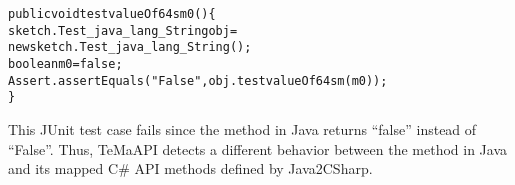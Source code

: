 \begin{CodeOut}%
\begin{alltt}
  public void testvalueOf64sm0()\{
    sketch.Test_java_lang_String obj =
          new sketch.Test_java_lang_String();
    boolean m0 = false;
    Assert.assertEquals("False", obj.testvalueOf64sm(m0));
  \}
\end{alltt}
\end{CodeOut}

This JUnit test case fails since the  method in Java returns ``false'' instead of ``False''. Thus, TeMaAPI detects a different behavior between the  method in Java and its mapped C\# API methods defined by Java2CSharp.


